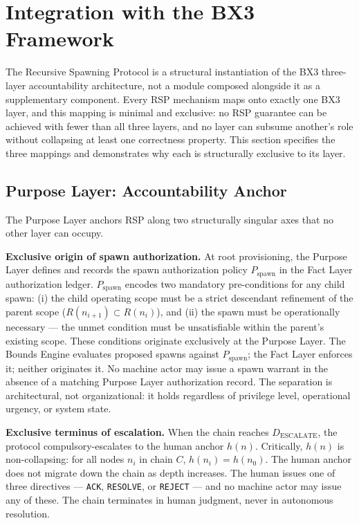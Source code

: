 \section{Integration with the BX3 Framework}
\label{sec:rs-integration}

The Recursive Spawning Protocol is a structural instantiation of the BX3 three-layer accountability architecture, not a module composed alongside it as a supplementary component. Every RSP mechanism maps onto exactly one BX3 layer, and this mapping is minimal and exclusive: no RSP guarantee can be achieved with fewer than all three layers, and no layer can subsume another's role without collapsing at least one correctness property. This section specifies the three mappings and demonstrates why each is structurally exclusive to its layer.

\subsection{Purpose Layer: Accountability Anchor}
\label{sec:rs-purpose-anchor}

The Purpose Layer anchors RSP along two structurally singular axes that no other layer can occupy.

\medskip
\noindent\textbf{Exclusive origin of spawn authorization.} At root provisioning, the Purpose Layer defines and records the spawn authorization policy $P_{\mathrm{spawn}}$ in the Fact Layer authorization ledger. $P_{\mathrm{spawn}}$ encodes two mandatory pre-conditions for any child spawn: (i) the child operating scope must be a strict descendant refinement of the parent scope ($R(n_{i+1}) \subset R(n_i)$), and (ii) the spawn must be operationally necessary --- the unmet condition must be unsatisfiable within the parent's existing scope. These conditions originate exclusively at the Purpose Layer. The Bounds Engine evaluates proposed spawns against $P_{\mathrm{spawn}}$; the Fact Layer enforces it; neither originates it. No machine actor may issue a spawn warrant in the absence of a matching Purpose Layer authorization record. The separation is architectural, not organizational: it holds regardless of privilege level, operational urgency, or system state.

\medskip
\noindent\textbf{Exclusive terminus of escalation.} When the chain reaches $D_{\mathrm{ESCALATE}}$, the protocol compulsory-escalates to the human anchor $h(n)$. Critically, $h(n)$ is non-collapsing: for all nodes $n_i$ in chain $C$, $h(n_i) = h(n_0)$. The human anchor does not migrate down the chain as depth increases. The human issues one of three directives --- \texttt{ACK}, \texttt{RESOLVE}, or \texttt{REJECT} --- and no machine actor may issue any of these. The chain terminates in human judgment, never in autonomous resolution.

